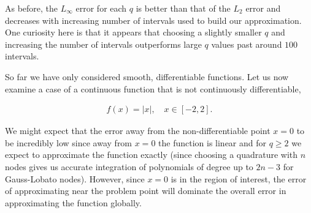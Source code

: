 \documentclass{article}
\begin{document}
\noindent As before, the $L_\infty$ error for each $q$ is better than that of the $L_2$ error and decreases with increasing number of intervals used to build our approximation. One curiosity here is that it appears that choosing a slightly smaller $q$ and increasing the number of intervals outperforms large $q$ values past around $100$ intervals. \newline

\noindent So far we have only considered smooth, differentiable functions. Let us now examine a case of a continuous function that is not continuously differentiable, 

\begin{align*}
  f(x) = | x | , \quad x \in [-2,2].
\end{align*}

\noindent We might expect that the error away from the non-differentiable point $x = 0$ to be incredibly low since away from $x = 0$ the function is linear and for $q \geq 2$ we expect to approximate the function exactly (since choosing a quadrature with $n$ nodes gives us accurate integration of polynomials of degree up to $2n - 3$ for Gauss-Lobato nodes). However, since $x = 0$ is in the region of interest, the error of approximating near the problem point will dominate the overall error in approximating the function globally. 
\end{document}
